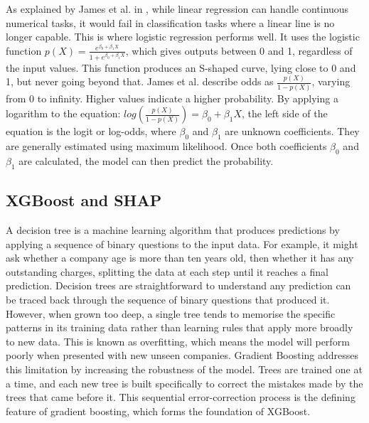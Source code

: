 \documentclass[ %
                    author={Natchalin Iwsakul \\[0.4em] Inkaphol Siriwongwattana \\[0.4em] Tanaphan Kummaraphat \\[0.6em] Patorn Srisupap},,
                supervisor={Fernando Moreno-Pino},
                    degree={MSc},
                     title={Propensity Modelling for SME Commercial Lending Using Open Public Data
},
                  subtitle={Companies House and GDELT as predictors of first-time borrowing},
                      type={},
                      year={2026}]{dissertation}
\begin{document}
As explained by James et al. in \cite{james_introduction_2013}, while linear regression can handle continuous numerical tasks, it would fail in classification tasks where a linear line is no longer capable. This is where logistic regression performs well. It uses the logistic function \(p(X) = \frac{e^{\beta_0 + \beta_1 X}}{1 + e^{\beta_0 +\beta_1 X}}\), which gives outputs between 0 and 1, regardless of the input values. This function produces an S-shaped curve, lying close to 0 and 1, but never going beyond that. James et al. \cite{james_introduction_2013} describe odds as \( \frac{p(X)}{1-p(X)}\), varying from 0 to infinity. Higher values indicate a higher probability. By applying a logarithm to the equation: \( log(\frac{p(X)}{1-p(X)}) = \beta_0 + \beta_1X\), the left side of the equation is the logit or log-odds, where \(\beta_0\) and \(\beta_1\) are unknown coefficients. They are generally estimated using maximum likelihood. Once both coefficients \(\beta_0\) and \(\beta_1\) are calculated, the model can then predict the probability.






\subsection{XGBoost and SHAP}

A decision tree is a machine learning algorithm that
produces predictions by applying a sequence of binary
questions to the input data. For example, it might ask
whether a company age is more than ten years old, then
whether it has any outstanding charges, splitting the
data at each step until it reaches a final prediction.
Decision trees are straightforward to understand 
any prediction can be traced back through the sequence
of binary questions that produced it. However, when
grown too deep, a single tree tends to memorise the
specific patterns in its training data rather than
learning rules that apply more broadly to new data.
This is known as overfitting, which means the model
will perform poorly when presented with new unseen
companies. Gradient Boosting addresses this limitation
by increasing the robustness of the model. Trees are
trained one at a time, and each new tree is built
specifically to correct the mistakes made by the trees
that came before it. This sequential error-correction
process is the defining feature of gradient boosting,
which forms the foundation of XGBoost.
\end{document}
